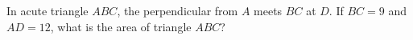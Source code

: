 In acute triangle $ABC$, the perpendicular from $A$ meets $BC$ at $D$. If $BC=9$ and $AD=12$, what is the area of triangle $ABC$?
